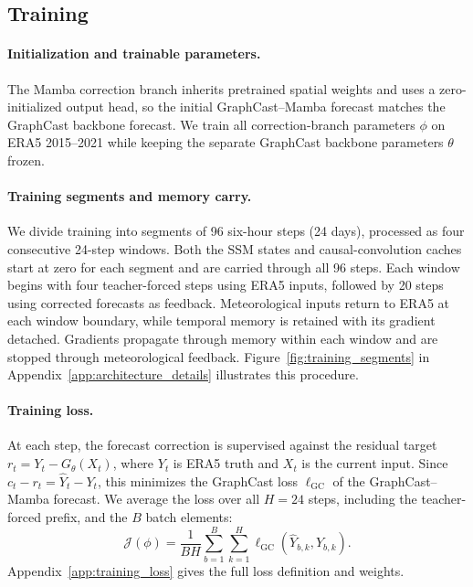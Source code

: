 \documentclass{article}
\begin{document}
\subsection{Training}
\label{sec:training}
\paragraph{Initialization and trainable parameters.}
The Mamba correction branch inherits pretrained spatial weights and uses a zero-initialized output head, so the initial GraphCast--Mamba forecast matches the GraphCast backbone forecast. We train all correction-branch parameters $\phi$ on ERA5 2015--2021 while keeping the separate GraphCast backbone parameters $\theta$ frozen.

\paragraph{Training segments and memory carry.}
We divide training into segments of 96 six-hour steps (24 days), processed as four consecutive 24-step windows. Both the SSM states and causal-convolution caches start at zero for each segment and are carried through all 96 steps. Each window begins with four teacher-forced steps using ERA5 inputs, followed by 20 steps using corrected forecasts as feedback. Meteorological inputs return to ERA5 at each window boundary, while temporal memory is retained with its gradient detached. Gradients propagate through memory within each window and are stopped through meteorological feedback. Figure~\ref{fig:training_segments} in Appendix~\ref{app:architecture_details} illustrates this procedure.

\paragraph{Training loss.}
At each step, the forecast correction is supervised against the residual target $r_t=Y_t-G_\theta(X_t)$, where $Y_t$ is ERA5 truth and $X_t$ is the current input. Since $c_t-r_t=\hat{Y}_t-Y_t$, this minimizes the {GraphCast loss} $\ell_{\mathrm{GC}}$ of the GraphCast--Mamba forecast. We average the loss over all $H=24$ steps, including the teacher-forced prefix, and the $B$ batch elements:
\begin{equation}
    \mathcal{J}(\phi)
    =\frac{1}{BH}\sum_{b=1}^{B}\sum_{k=1}^{H}
      \ell_{\mathrm{GC}}(\hat{Y}_{b,k},Y_{b,k}).
    \label{eq:training_objective}
\end{equation}
Appendix~\ref{app:training_loss} gives the full loss definition and weights.
\end{document}
